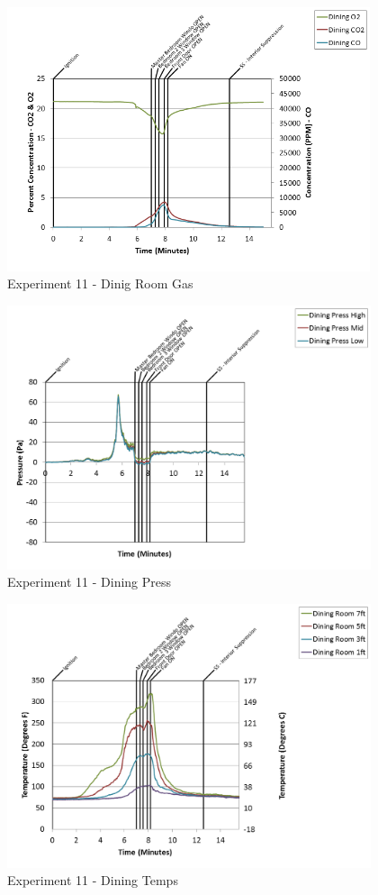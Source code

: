 \documentclass{article}
\begin{document}
\begin{appendices}
\clearpage

\begin{figure}[h!]
	\centering
	\includegraphics[height=3.05in]{0_Images/Results_Charts/Exp_11_Charts/DinigRoomGas.png}
	\caption{Experiment 11 - Dinig Room Gas}
\end{figure}


\begin{figure}[h!]
	\centering
	\includegraphics[height=3.05in]{0_Images/Results_Charts/Exp_11_Charts/DiningPress.png}
	\caption{Experiment 11 - Dining Press}
\end{figure}

\clearpage

\begin{figure}[h!]
	\centering
	\includegraphics[height=3.05in]{0_Images/Results_Charts/Exp_11_Charts/DiningTemps.png}
	\caption{Experiment 11 - Dining Temps}
\end{figure}



\end{appendices}
\end{document}

